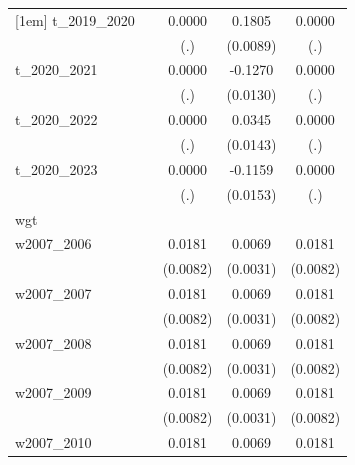 \begin{table}[htbp]
\begin{tabular}{l*{4}{c}}
[1em]
t\_2019\_2020 &                     &      0.0000         &      0.1805\sym{***}&      0.0000         \\
            &                     &         (.)         &    (0.0089)         &         (.)         \\
[1em]
t\_2020\_2021 &                     &      0.0000         &     -0.1270\sym{***}&      0.0000         \\
            &                     &         (.)         &    (0.0130)         &         (.)         \\
[1em]
t\_2020\_2022 &                     &      0.0000         &      0.0345\sym{**} &      0.0000         \\
            &                     &         (.)         &    (0.0143)         &         (.)         \\
[1em]
t\_2020\_2023 &                     &      0.0000         &     -0.1159\sym{***}&      0.0000         \\
            &                     &         (.)         &    (0.0153)         &         (.)         \\
\hline
wgt         &                     &                     &                     &                     \\
w2007\_2006  &                     &      0.0181\sym{**} &      0.0069\sym{**} &      0.0181\sym{**} \\
            &                     &    (0.0082)         &    (0.0031)         &    (0.0082)         \\
[1em]
w2007\_2007  &                     &      0.0181\sym{**} &      0.0069\sym{**} &      0.0181\sym{**} \\
            &                     &    (0.0082)         &    (0.0031)         &    (0.0082)         \\
[1em]
w2007\_2008  &                     &      0.0181\sym{**} &      0.0069\sym{**} &      0.0181\sym{**} \\
            &                     &    (0.0082)         &    (0.0031)         &    (0.0082)         \\
[1em]
w2007\_2009  &                     &      0.0181\sym{**} &      0.0069\sym{**} &      0.0181\sym{**} \\
            &                     &    (0.0082)         &    (0.0031)         &    (0.0082)         \\
[1em]
w2007\_2010  &                     &      0.0181\sym{**} &      0.0069\sym{**} &      0.0181\sym{**} \\

\end{tabular}
\end{table}
